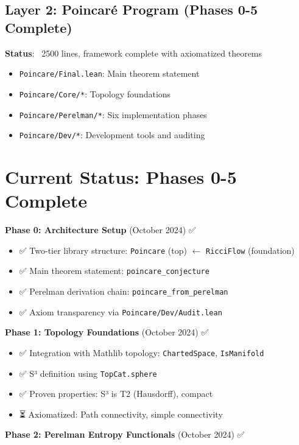 \subsection{Layer 2: Poincaré Program (Phases 0-5 Complete)}

\textbf{Status}: ~2500 lines, framework complete with axiomatized theorems

\begin{itemize}
\item \texttt{Poincare/Final.lean}: Main theorem statement
\item \texttt{Poincare/Core/*}: Topology foundations
\item \texttt{Poincare/Perelman/*}: Six implementation phases
\item \texttt{Poincare/Dev/*}: Development tools and auditing
\end{itemize}

\section{Current Status: Phases 0-5 Complete}

\textbf{Phase 0: Architecture Setup} (October 2024) ✅

\begin{itemize}
\item ✅ Two-tier library structure: \texttt{Poincare} (top) $\leftarrow$ \texttt{RicciFlow} (foundation)
\item ✅ Main theorem statement: \texttt{poincare_conjecture}
\item ✅ Perelman derivation chain: \texttt{poincare_from_perelman}
\item ✅ Axiom transparency via \texttt{Poincare/Dev/Audit.lean}
\end{itemize}

\textbf{Phase 1: Topology Foundations} (October 2024) ✅

\begin{itemize}
\item ✅ Integration with Mathlib topology: \texttt{ChartedSpace}, \texttt{IsManifold}
\item ✅ S³ definition using \texttt{TopCat.sphere}
\item ✅ Proven properties: S³ is T2 (Hausdorff), compact
\item ⏳ Axiomatized: Path connectivity, simple connectivity
\end{itemize}

\textbf{Phase 2: Perelman Entropy Functionals} (October 2024) ✅

